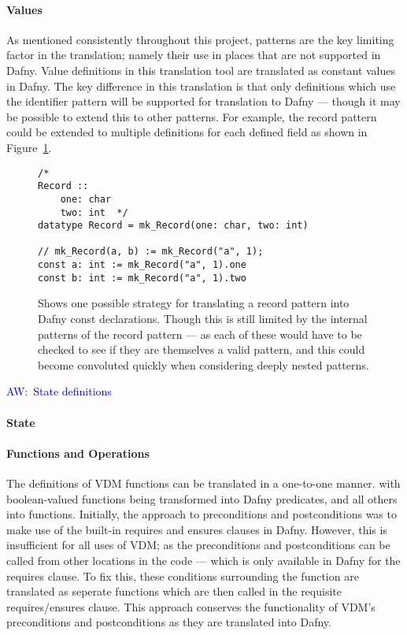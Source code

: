 \documentclass{entcs}
\newcommand{\awcomment}[1]{\ifthenelse { \boolean{showComments} } {\textcolor{blue}{AW:~#1}} { } } %
\begin{document}
\paragraph{Values} 

As mentioned consistently throughout this project, patterns are the key limiting factor in the translation; namely their use in places that are not supported in Dafny. Value definitions in this translation tool are translated as constant values in Dafny. The key difference in this translation is that only definitions which use the identifier pattern will be supported for translation to Dafny --- though it may be possible to extend this to other patterns. For example, the record pattern could be extended to multiple definitions for each defined field as shown in Figure~\ref{fig:const_pattern}.

\begin{figure}[h]
	\begin{center}
        \begin{lstlisting}[language=Dafny]
/*
Record :: 
    one: char 
    two: int  */
datatype Record = mk_Record(one: char, two: int)

// mk_Record(a, b) := mk_Record("a", 1);
const a: int := mk_Record("a", 1).one
const b: int := mk_Record("a", 1).two
        \end{lstlisting}
		\caption{Shows one possible strategy for translating a record pattern into Dafny const declarations. Though this is still limited by the internal patterns of the record pattern --- as each of these would have to be checked to see if they are themselves a valid pattern, and this could become convoluted quickly when considering deeply nested patterns.}\label{fig:const_pattern}
	\end{center}
\end{figure}

\awcomment{State definitions}
\paragraph{State} 

\paragraph{Functions and Operations} 
The definitions of VDM functions can be translated in a one-to-one manner. with boolean-valued functions being transformed into Dafny predicates, and all others into functions. Initially, the approach to preconditions and postconditions was to make use of the built-in requires and ensures clauses in Dafny. However, this is insufficient for all uses of VDM; as the preconditions and postconditions can be called from other locations in the code --- which is only available in Dafny for the requires clause. To fix this, these conditions surrounding the function are translated as seperate functions which are then called in the requisite requires/ensures clause. This approach conserves the functionality of VDM's preconditions and postconditions as they are translated into Dafny. 
\end{document}
